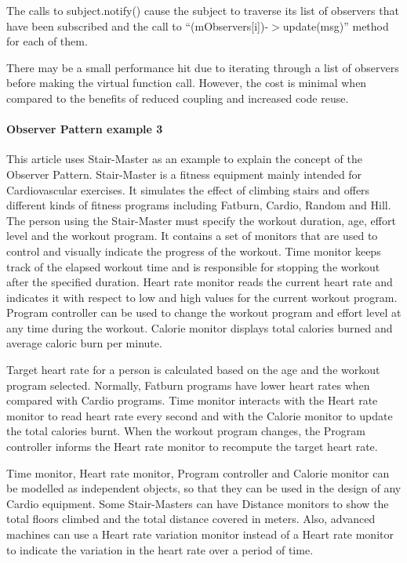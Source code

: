 \documentclass{book}
\begin{document}
The calls to subject.notify() cause the subject to traverse its list of observers that have been subscribed and the call to ``(mObservers[i])-$>$update(msg)'' method for each of them.

There may be a small performance hit due to iterating through a list of observers before making the virtual function call.
However, the cost is minimal when compared to the benefits of reduced coupling and increased code reuse.

\paragraph{Observer Pattern example 3}
This article uses Stair-Master as an example to explain the concept of the Observer Pattern. Stair-Master is a fitness equipment mainly intended for Cardiovascular exercises.
It simulates the effect of climbing stairs and offers different kinds of fitness programs including Fatburn, Cardio, Random and Hill.
The person using the Stair-Master must specify the workout duration, age, effort level and the workout program.
It contains a set of monitors that are used to control and visually indicate the progress of the workout.
Time monitor keeps track of the elapsed workout time and is responsible for stopping the workout after the specified duration.
Heart rate monitor reads the current heart rate and indicates it with respect to low and high values for the current workout program.
Program controller can be used to change the workout program and effort level at any time during the workout.
Calorie monitor displays total calories burned and average caloric burn per minute.

Target heart rate for a person is calculated based on the age and the workout program selected.
Normally, Fatburn programs have lower heart rates when compared with Cardio programs.
Time monitor interacts with the Heart rate monitor to read heart rate every second and with the Calorie monitor to update the total calories burnt.
When the workout program changes, the Program controller informs the Heart rate monitor to recompute the target heart rate.

Time monitor, Heart rate monitor, Program controller and Calorie monitor can be modelled as independent objects, so that they can be used in the design of any Cardio equipment.
Some Stair-Masters can have Distance monitors to show the total floors climbed and the total distance covered in meters.
Also, advanced machines can use a Heart rate variation monitor instead of a Heart rate monitor to indicate the variation in the heart rate over a period of time. 
\begin{figure}[H]
\begin{floatrow}
\end{floatrow}
\end{figure}
\end{document}
